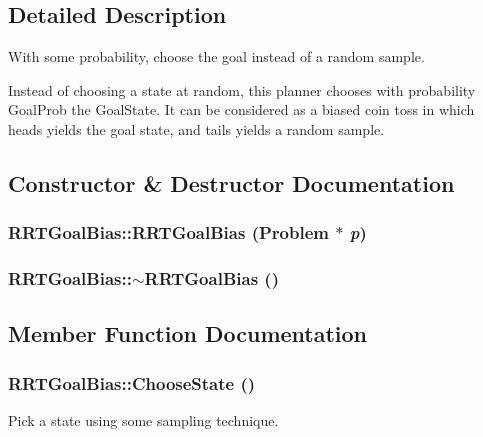 \subsection{Detailed Description}
With some probability, choose the goal instead of a random sample.

Instead of choosing a state at random, this planner chooses with probability Goal\-Prob the Goal\-State. It can be considered as a  biased coin toss in which heads yields the goal state, and tails yields a random sample. 



\subsection{Constructor \& Destructor Documentation}
\subsubsection{\setlength{\rightskip}{0pt plus 5cm}RRTGoal\-Bias::RRTGoal\-Bias ({\bf Problem} $\ast$ {\em p})}\label{classRRTGoalBias_a0}


\subsubsection{\setlength{\rightskip}{0pt plus 5cm}RRTGoal\-Bias::$\sim$RRTGoal\-Bias ()\hspace{0.3cm}{\tt  [inline, virtual]}}\label{classRRTGoalBias_a1}




\subsection{Member Function Documentation}
\subsubsection{ RRTGoal\-Bias::Choose\-State ()\hspace{0.3cm}{\tt  [protected, virtual]}}\label{classRRTGoalBias_b0}


Pick a state using some sampling technique.



